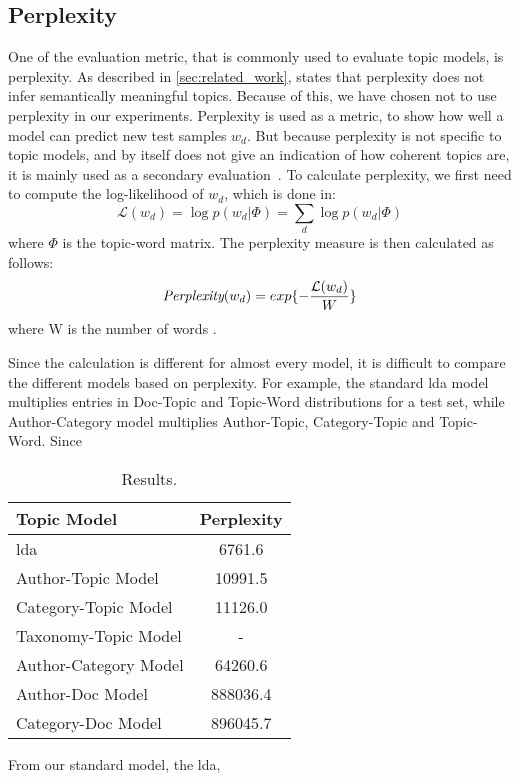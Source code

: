 \subsection{Perplexity}\label{app:perplexity}
One of the evaluation metric, that is commonly used to evaluate topic models, is perplexity.
As described in \autoref{sec:related_work}, \citet{tea_leaves} states that perplexity does not infer semantically meaningful topics.
Because of this, we have chosen not to use perplexity in our experiments.
Perplexity is used as a metric, to show how well a model can predict new test samples $w_d$.
But because perplexity is not specific to topic models, and by itself does not give an indication of how coherent topics are, it is mainly used as a secondary evaluation~\cite{tea_leaves}.
To calculate perplexity, we first need to compute the log-likelihood of $w_d$, which is done in:
\begin{equation}\label{eq:likelihood}
	\mathcal{L}(w_d) = \log p(w_d|\Phi) = \sum_{d} \log p(w_d|\Phi)
\end{equation}
\noindent where $\Phi$ is the topic-word matrix.
The perplexity measure is then calculated as follows:
\begin{equation}
	\emph{Perplexity}(w_d) = exp \{-\frac{\mathcal{L}(w_d)}{W}\}
\end{equation}
\noindent where W is the number of words \cite{de2008evaluating}.

Since the calculation is different for almost every model, it is difficult to compare the different models based on perplexity.
For example, the standard \gls{lda} model multiplies entries in Doc-Topic and Topic-Word distributions for a test set, while Author-Category model multiplies Author-Topic, Category-Topic and Topic-Word.
Since 

\begin{table}[h]
	\centering
	\caption{Results.}
	\begin{tabular}{l|c}
		Topic Model & Perplexity \\
		\midrule
		\Acrlong{lda} & 6761.6 \\
		Author-Topic Model & 10991.5 \\
		Category-Topic Model & 11126.0 \\
		Taxonomy-Topic Model & - \\
		Author-Category Model & 64260.6  \\
		Author-Doc Model & 888036.4  \\
		Category-Doc Model & 896045.7 \\
	\end{tabular}
	\label{tab:app_perplexity}
\end{table}

From our standard model, the \gls{lda}, 